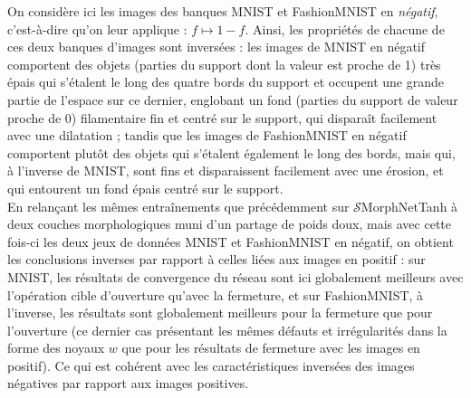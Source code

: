 On considère ici les images des banques MNIST et FashionMNIST en \textit{négatif}, c'est-à-dire qu'on leur applique : $f \mapsto 1-f$. Ainsi, les propriétés de chacune de ces deux banques d'images sont inversées : les images de MNIST en négatif comportent des objets (parties du support dont la valeur est proche de 1) très épais qui s'étalent le long des quatre bords du support et occupent une grande partie de l'espace sur ce dernier, englobant un fond (parties du support de valeur proche de 0) filamentaire fin et centré sur le support, qui disparaît facilement avec une dilatation ; tandis que les images de FashionMNIST en négatif comportent plutôt des objets qui s'étalent également le long des bords, mais qui, à l'inverse de MNIST, sont fins et disparaissent facilement avec une érosion, et qui entourent un fond épais centré sur le support. \\

\vspace{-1.6mm}
\noindent En relançant les mêmes entraînements que précédemment sur $\mathcal{S}$MorphNetTanh à deux couches morphologiques muni d'un partage de poids doux, mais avec cette fois-ci les deux jeux de données MNIST et FashionMNIST en négatif, on obtient les conclusions inverses par rapport à celles liées aux images en positif : sur MNIST, les résultats de convergence du réseau sont ici globalement meilleurs avec l'opération cible d'ouverture qu'avec la fermeture, et sur FashionMNIST, à l'inverse, les résultats sont globalement meilleurs pour la fermeture que pour l'ouverture (ce dernier cas présentant les mêmes défauts et irrégularités dans la forme des noyaux $w$ que pour les résultats de fermeture avec les images en positif). Ce qui est cohérent avec les caractéristiques inversées des images négatives par rapport aux images positives.


